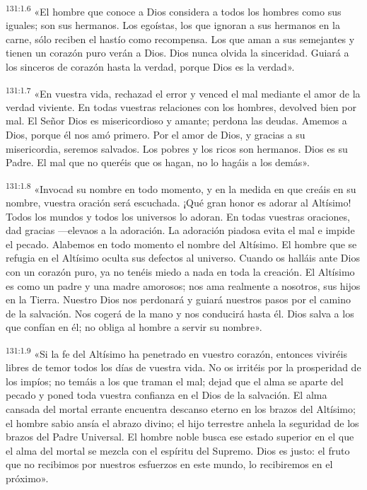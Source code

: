 \par
\textsuperscript{131:1.6} «El hombre que conoce a Dios considera a todos los hombres como sus iguales; son sus hermanos. Los egoístas, los que ignoran a sus hermanos en la carne, sólo reciben el hastío como recompensa. Los que aman a sus semejantes y tienen un corazón puro verán a Dios. Dios nunca olvida la sinceridad. Guiará a los sinceros de corazón hasta la verdad, porque Dios es la verdad».

\par
\textsuperscript{131:1.7} «En vuestra vida, rechazad el error y venced el mal mediante el amor de la verdad viviente. En todas vuestras relaciones con los hombres, devolved bien por mal. El Señor Dios es misericordioso y amante; perdona las deudas. Amemos a Dios, porque él nos amó primero. Por el amor de Dios, y gracias a su misericordia, seremos salvados. Los pobres y los ricos son hermanos. Dios es su Padre. El mal que no queréis que os hagan, no lo hagáis a los demás».

\par
\textsuperscript{131:1.8} «Invocad su nombre en todo momento, y en la medida en que creáis en su nombre, vuestra oración será escuchada. ¡Qué gran honor es adorar al Altísimo! Todos los mundos y todos los universos lo adoran. En todas vuestras oraciones, dad gracias ---elevaos a la adoración. La adoración piadosa evita el mal e impide el pecado. Alabemos en todo momento el nombre del Altísimo. El hombre que se refugia en el Altísimo oculta sus defectos al universo. Cuando os halláis ante Dios con un corazón puro, ya no tenéis miedo a nada en toda la creación. El Altísimo es como un padre y una madre amorosos; nos ama realmente a nosotros, sus hijos en la Tierra. Nuestro Dios nos perdonará y guiará nuestros pasos por el camino de la salvación. Nos cogerá de la mano y nos conducirá hasta él. Dios salva a los que confían en él; no obliga al hombre a servir su nombre».

\par
\textsuperscript{131:1.9} «Si la fe del Altísimo ha penetrado en vuestro corazón, entonces viviréis libres de temor todos los días de vuestra vida. No os irritéis por la prosperidad de los impíos; no temáis a los que traman el mal; dejad que el alma se aparte del pecado y poned toda vuestra confianza en el Dios de la salvación. El alma cansada del mortal errante encuentra descanso eterno en los brazos del Altísimo; el hombre sabio ansía el abrazo divino; el hijo terrestre anhela la seguridad de los brazos del Padre Universal. El hombre noble busca ese estado superior en el que el alma del mortal se mezcla con el espíritu del Supremo. Dios es justo: el fruto que no recibimos por nuestros esfuerzos en este mundo, lo recibiremos en el próximo».

